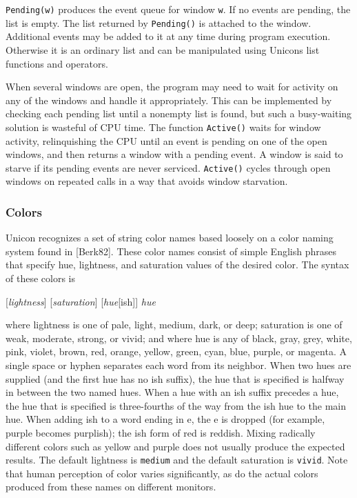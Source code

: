 \texttt{Pending(w)} produces the event queue for window \texttt{w}.
If no events are pending, the list is empty. The list returned by
\texttt{Pending()} is
attached to the window. Additional events may be added to it at any
time during program execution. Otherwise it is an ordinary list and
can be manipulated using Unicon{\textquotesingle}s list functions and
operators.

When several windows are open, the program may need to wait for activity
on any of the windows and handle it appropriately. This can be
implemented by checking each pending list until a nonempty list is
found, but such a busy-waiting solution is wasteful of CPU time. The
function \texttt{Active()} waits for window activity, relinquishing the CPU
until an event is pending on one of the open windows, and then returns
a window with a pending event. A window is said to starve if its
pending events are never serviced. \texttt{Active()} cycles through open windows
on repeated calls in a way that avoids window starvation.

\subsubsection{Colors}

Unicon recognizes a set of string color names based loosely on a color
naming system found in [Berk82]. These color names consist of simple
English phrases that specify hue, lightness, and saturation values of
the desired color. The syntax of these colors is

[\textit{lightness}] [\textit{saturation}] [\textit{hue}[ish]]
\textit{hue}

where lightness is one of pale, light, medium, dark, or deep; saturation
is one of weak, moderate, strong, or vivid; and where hue is any of
black, gray, grey, white, pink, violet, brown, red, orange, yellow,
green, cyan, blue, purple, or magenta. A single space or hyphen
separates each word from its neighbor. When two hues are supplied
(and the first hue has no ish suffix), the hue that is specified is
halfway in between the two named hues. When a hue with an ish suffix
precedes a hue, the hue that is specified is three-fourths of the way
from the ish hue to the main hue. When adding ish to a word ending in
e, the e is dropped (for example, purple becomes purplish); the ish
form of red is reddish. Mixing radically different colors such as
yellow and purple does not usually produce the expected results. The
default lightness is \texttt{medium} and the default saturation is
\texttt{vivid}. Note that human perception of color varies significantly, as
do the actual colors produced from these names on different monitors.

